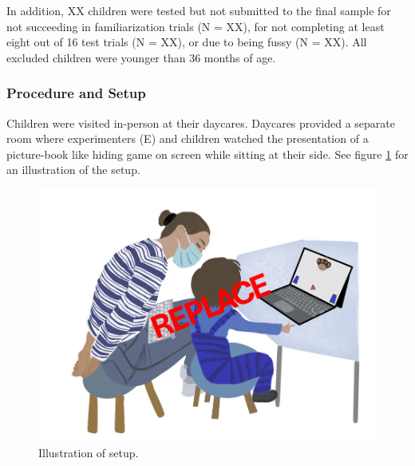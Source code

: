 \documentclass[
  man]{apa6}
\begin{document}
In addition, XX children were tested but not submitted to the final sample for not succeeding in familiarization trials (N = XX), for not completing at least eight out of 16 test trials (N = XX), or due to being fussy (N = XX). All excluded children were younger than 36 months of age.

\subsubsection{Procedure and Setup}\label{procedure-and-setup}

Children were visited in-person at their daycares. Daycares provided a separate room where experimenters (E) and children watched the presentation of a picture-book like hiding game on screen while sitting at their side. See figure \ref{fig:figure-setup} for an illustration of the setup.



\begin{figure}

{\centering \includegraphics{./illustrations/Symlit_Rep_Setup} 

}

\caption{Illustration of setup.}\label{fig:figure-setup}
\end{figure}
\end{document}
